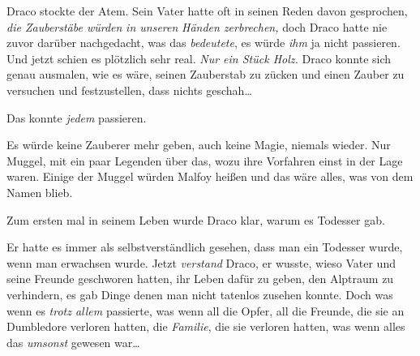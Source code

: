 Draco stockte der Atem. Sein Vater hatte oft in seinen Reden davon gesprochen, \emph{die Zauberstäbe würden} \emph{in unseren} \emph{Händen zerbrechen,} doch Draco hatte nie zuvor darüber nachgedacht, was das \emph{bedeutete}, es würde \emph{ihm} ja nicht passieren. Und jetzt schien es plötzlich sehr real. \emph{Nur ein Stück Holz.} Draco konnte sich genau ausmalen, wie es wäre, seinen Zauberstab zu zücken und einen Zauber zu versuchen und festzustellen, dass nichts geschah…

Das konnte \emph{jedem} passieren.

Es würde keine Zauberer mehr geben, auch keine Magie, niemals wieder. Nur Muggel, mit ein paar Legenden über das, wozu ihre Vorfahren einst in der Lage waren. Einige der Muggel würden Malfoy heißen und das wäre alles, was von dem Namen blieb.

Zum ersten mal in seinem Leben wurde Draco klar, warum es Todesser gab.

Er hatte es immer als selbstverständlich gesehen, dass man ein Todesser wurde, wenn man erwachsen wurde. Jetzt \emph{verstand} Draco, er wusste, wieso Vater und seine Freunde geschworen hatten, ihr Leben dafür zu geben, den Alptraum zu verhindern, es gab Dinge denen man nicht tatenlos zusehen konnte. Doch was wenn es \emph{trotz allem} passierte, was wenn all die Opfer, all die Freunde, die sie an Dumbledore verloren hatten, die \emph{Familie}, die sie verloren hatten, was wenn alles das \emph{umsonst} gewesen war…

